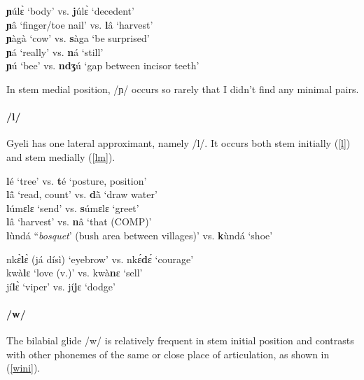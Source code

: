 \begin{exe} \ex \label{ny}
{\bfseries ɲ}úlɛ̀ `body' vs. {\bfseries j}úlɛ̀ `decedent' \\
{\bfseries ɲ}â `finger/toe nail'  vs. {\bfseries l}â `harvest' \\
{\bfseries ɲ}àgà `cow' vs. {\bfseries s}àga `be surprised' \\
{\bfseries ɲ}á `really' vs. {\bfseries n}á `still' \\
{\bfseries ɲ}ú `bee' vs. {\bfseries ndʒ}ú `gap between incisor teeth'
\end{exe}

\noindent In stem medial position, /ɲ/ occurs so rarely that I didn't find any minimal pairs. 

\paragraph{\bfseries /l/} Gyeli has one lateral approximant, namely /l/. It occurs both stem initially (\ref{l}) and stem medially (\ref{lm}).

\begin{exe} \ex \label{l}
{\bfseries l}é `tree' vs. {\bfseries t}é `posture, position' \\
{\bfseries l}ã̂ `read, count' vs. {\bfseries d}ã̀ `draw water' \\
{\bfseries l}úmɛlɛ `send' vs. {\bfseries s}úmɛlɛ `greet' \\
{\bfseries l}â `harvest' vs. {\bfseries n}â `that (COMP)' \\
{\bfseries l}ùndá ``{\itshape bosquet}' (bush area between villages)' vs. {\bfseries k}ùndá `shoe' 
\end{exe}

\begin{exe} \ex \label{lm}
nkɛ̀{\bfseries l}ɛ̀ (já dísì) `eyebrow' vs. nkɛ́{\bfseries d}ɛ́ `courage' \\
kwà{\bfseries l}ɛ `love (v.)' vs. kwà{\bfseries n}ɛ `sell' \\
jí{\bfseries l}ɛ̀ `viper' vs. jí{\bfseries j}ɛ `dodge'
\end{exe}

\paragraph{\bfseries /w/} The bilabial glide /w/ is relatively frequent in stem initial position and contrasts with other phonemes of the same or close place of articulation, as shown in (\ref{wini}).

